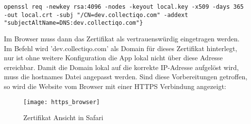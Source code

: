 \vspace{1em}
\lstset{language=sh}
\begin{lstlisting}[label={lst:openssl}]
openssl req -newkey rsa:4096 -nodes -keyout local.key -x509 -days 365 -out local.crt -subj "/CN=dev.collectiqo.com" -addext "subjectAltName=DNS:dev.collectiqo.com"}
\end{lstlisting}
\vspace{1em}

Im Browser muss dann das Zertifikat als vertrauenswürdig eingetragen werden.
Im Befehl wird 'dev.collectiqo.com' als Domain für dieses Zertifikat hinterlegt, nur ist ohne weitere Konfiguration die App lokal nicht über diese Adresse erreichbar.
Damit die Domain lokal auf die korrekte IP-Adresse aufgelöst wird, muss die hostnames Datei angepasst werden.
Sind diese Vorbereitungen getroffen, so wird die Website vom Browser mit einer HTTPS Verbindung angezeigt:

\begin{figure}[h]
    \centering
    \texttt{[image: https\_browser]}
    \caption{Zertifikat Ansicht in Safari}
    \label{fig:https_browser}
\end{figure}